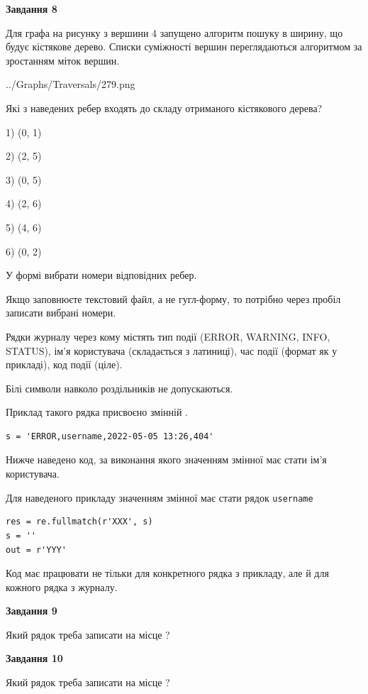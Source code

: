 \documentclass[12pt, ukrainian]{article}
\def\code#1{\Verb!#1!}
\begin{document}
{\begin {large}
{\begin {center}\textbf{Завдання 8}\end {center}}\par
Для графа на рисунку з вершини 4 запущено алгоритм пошуку в ширину, що будує кістякове дерево. Списки суміжності вершин переглядаються алгоритмом за зростанням міток вершин.\par
\begin{center}
	{../Graphs/Traversals/279.png}
\end{center}
\par Які з наведених ребер входять до складу отриманого кістякового дерева?\par
1) (0, 1)\par
2) (2, 5)\par
3) (0, 5)\par
4) (2, 6)\par
5) (4, 6)\par
6) (0, 2)\par
{\vskip 15pt} У формі вибрати номери відповідних ребер.


Якщо заповнюєте текстовий файл, а не гугл-форму, то потрібно через пробіл записа\-ти вибрані номери.\par
\newpage


Рядки журналу через кому містять тип події (ERROR, WARNING, INFO, STATUS), ім'я користувача (складається з латиниці), час події (фор\-мат як у прикладі), код події (ціле).

Білі символи навколо роздільників не допускаються.

Приклад такого рядка присвоєно змінній .



\begin{verbatim}
s = 'ERROR,username,2022-05-05 13:26,404'
\end{verbatim}


Нижче наведено код, за виконання якого значенням змінної  має стати ім'я користувача.

Для наведеного прикладу значенням змінної  має стати рядок \code{username}



\begin{verbatim}
res = re.fullmatch(r'XXX', s)
s = ''
out = r'YYY'
\end{verbatim}


Код має працювати не тільки для конкретного рядка з прикладу, але й для кожного рядка з журналу.

{\begin {center}\textbf{Завдання 9}\end {center}}\par
Який рядок треба записати на місце  ?\par
\vspace{5mm}


{\begin {center}\textbf{Завдання 10}\end {center}}\par
Який рядок треба записати на місце  ?\par


\newpage


\end {large}}
\end{document}
